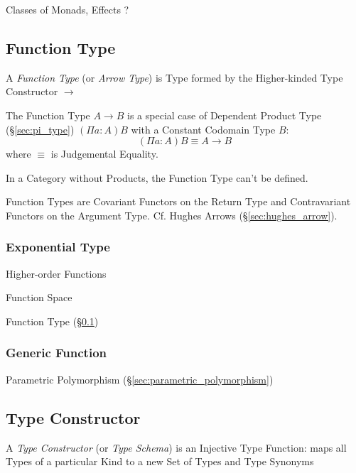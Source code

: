 Classes of Monads, Effects ?



\subsection{Function Type}\label{sec:function_type}

A \emph{Function Type} (or \emph{Arrow Type}) is Type formed by the
Higher-kinded Type Constructor $\rightarrow$

The Function Type $A \rightarrow B$ is a special case of Dependent
Product Type (\S\ref{sec:pi_type}) $(\Pi a:A)B$ with a Constant
Codomain Type $B$:
\[
  (\Pi a:A)B \equiv A \rightarrow B
\]
where $\equiv$ is Judgemental Equality.

In a Category without Products, the Function Type can't be defined.

Function Types are Covariant Functors on the Return Type and
Contravariant Functors on the Argument Type. Cf. Hughes Arrows
(\S\ref{sec:hughes_arrow}).



\subsubsection{Exponential Type}\label{sec:exponential_type}

Higher-order Functions

Function Space

Function Type (\S\ref{sec:function_type})



\subsubsection{Generic Function}\label{sec:generic_function}

Parametric Polymorphism (\S\ref{sec:parametric_polymorphism})



\subsection{Type Constructor}\label{sec:type_constructor}

A \emph{Type Constructor} (or \emph{Type Schema}) is an Injective Type
Function: maps all Types of a particular Kind to a new Set of Types
and Type Synonyms



